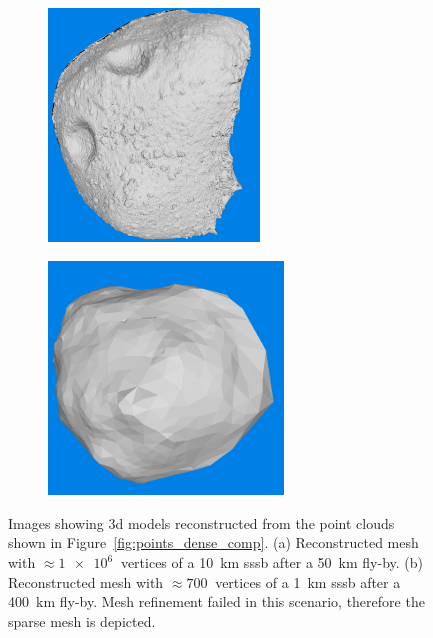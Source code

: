 \begin{figure}[H]
    \centering
        \begin{subfigure}[b]{0.42\textwidth}
            \centering
            \includegraphics[width=\textwidth,height=6.2cm]{doc/thesis/0_figures/models_quality/50_10/120_50_10_refine2.png}
            \caption{} %
            \label{fig:models_50_10}
        \end{subfigure}
        \begin{subfigure}[b]{0.42\textwidth}
            \centering
            \includegraphics[width=\textwidth,height=6.2cm]{doc/thesis/0_figures/models_quality/400_1/120_400_1_mesh2.png}
            \caption{}
            \label{fig:models_400_1}
        \end{subfigure}
    \caption{Images showing \gls{3d} models reconstructed from the point clouds shown in Figure~\ref{fig:points_dense_comp}. (a) Reconstructed mesh with $\approx\SI{1e6}{}$ vertices of a \SI{10}{\kilo\meter} \gls{sssb} after a \SI{50}{\kilo\meter} fly-by. (b) Reconstructed mesh with $\approx\SI{700}{}$ vertices of a \SI{1}{\kilo\meter} \gls{sssb} after a \SI{400}{\kilo\meter} fly-by. Mesh refinement failed in this scenario, therefore the sparse mesh is depicted.}
    \label{fig:models_comp}
\end{figure}

